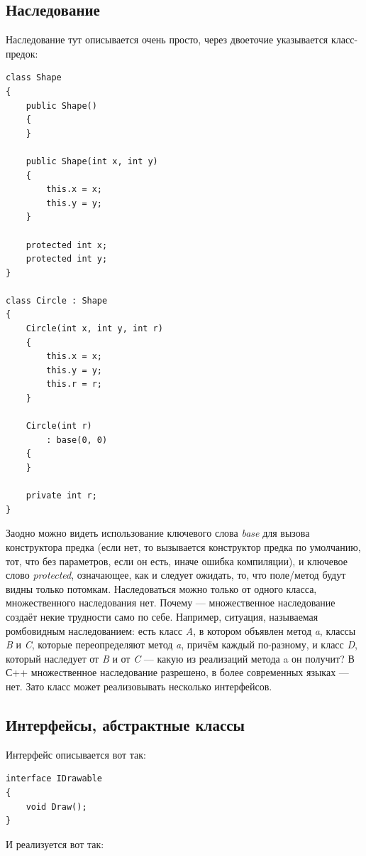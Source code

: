 \documentclass{../../text-style}
\begin{document}
\subsection{Наследование}

Наследование тут описывается очень просто, через двоеточие указывается класс-предок:

\begin{verbatim}
class Shape
{
    public Shape() 
    {
    }

    public Shape(int x, int y)
    {
        this.x = x;
        this.y = y;
    }

    protected int x;
    protected int y;
}

class Circle : Shape
{
    Circle(int x, int y, int r)
    {
        this.x = x;
        this.y = y;
        this.r = r;
    }

    Circle(int r)
        : base(0, 0)
    {
    }

    private int r;
}
\end{verbatim}

Заодно можно видеть использование ключевого слова \textit{base} для вызова конструктора предка (если нет, то вызывается конструктор предка по умолчанию, тот, что без параметров, если он есть, иначе ошибка компиляции), и ключевое слово \textit{protected}, означающее, как и следует ожидать, то, что поле/метод будут видны только потомкам. Наследоваться можно только от одного класса, множественного наследования нет. Почему --- множественное наследование создаёт некие трудности само по себе. Например, ситуация, называемая ромбовидным наследованием: есть класс \textit{A}, в котором объявлен метод \textit{a}, классы \textit{B} и \textit{C}, которые переопределяют метод \textit{a}, причём каждый по-разному, и класс \textit{D}, который наследует от \textit{B} и от \textit{C} --- какую из реализаций метода a он получит? В С++ множественное наследование разрешено, в более современных языках --- нет. Зато класс может реализовывать несколько интерфейсов.

\subsection{Интерфейсы, абстрактные классы}

Интерфейс описывается вот так:

\begin{verbatim}
interface IDrawable
{
    void Draw();
}
\end{verbatim}

И реализуется вот так:
\end{document}
